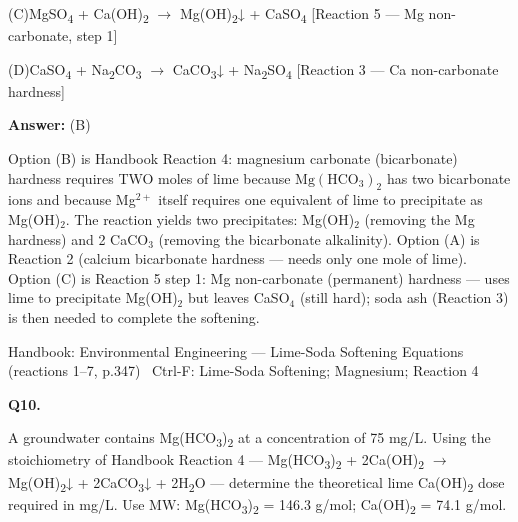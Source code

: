 \documentclass[11pt]{article}
\newcommand{\optline}[2]{\par\noindent\hspace{1.2em}(#1)\hspace{0.6em}#2}
\begin{document}
\optline{C}{MgSO\textsubscript{4} + Ca(OH)\textsubscript{2} $\rightarrow$ Mg(OH)\textsubscript{2}↓ + CaSO\textsubscript{4}  [Reaction 5 --- Mg non-carbonate, step 1]}
\optline{D}{CaSO\textsubscript{4} + Na\textsubscript{2}CO\textsubscript{3} $\rightarrow$ CaCO\textsubscript{3}↓ + Na\textsubscript{2}SO\textsubscript{4}  [Reaction 3 --- Ca non-carbonate hardness]}
\par\vspace{3pt}
\vspace{2pt}\par\noindent\colorbox{boxbg}{\parbox{\dimexpr\linewidth-2\fboxsep\relax}{%
\vspace{2pt}\textbf{Answer:} (B)\par\vspace{2pt}
{\small Option (B) is Handbook Reaction 4: magnesium carbonate (bicarbonate) hardness requires TWO moles of lime because $\mathrm{Mg(HCO_3)_2}$ has two bicarbonate ions and because Mg$^{2+}$ itself requires one equivalent of lime to precipitate as Mg(OH)$_2$. The reaction yields two precipitates: Mg(OH)$_2$ (removing the Mg hardness) and 2 CaCO$_3$ (removing the bicarbonate alkalinity). Option (A) is Reaction 2 (calcium bicarbonate hardness --- needs only one mole of lime). Option (C) is Reaction 5 step 1: Mg non-carbonate (permanent) hardness --- uses lime to precipitate Mg(OH)$_2$ but leaves CaSO$_4$ (still hard); soda ash (Reaction 3) is then needed to complete the softening.}\par\vspace{2pt}
{\footnotesize\color{soft}Handbook: Environmental Engineering --- Lime-Soda Softening Equations (reactions 1--7, p.347) \textbullet\ Ctrl-F: Lime-Soda Softening; Magnesium; Reaction 4}\vspace{2pt}
}}
\vspace{9pt}
\filbreak
\textbf{\color{accent}Q10.}\par\vspace{2pt}
A groundwater contains Mg(HCO\textsubscript{3})\textsubscript{2} at a concentration of 75 mg/L. Using the stoichiometry of Handbook Reaction 4 --- Mg(HCO\textsubscript{3})\textsubscript{2} + 2Ca(OH)\textsubscript{2} $\rightarrow$ Mg(OH)\textsubscript{2}↓ + 2CaCO\textsubscript{3}↓ + 2H\textsubscript{2}O --- determine the theoretical lime Ca(OH)\textsubscript{2} dose required in mg/L. Use MW: Mg(HCO\textsubscript{3})\textsubscript{2} = 146.3 g/mol; Ca(OH)\textsubscript{2} = 74.1 g/mol.\par\vspace{3pt}
\end{document}
